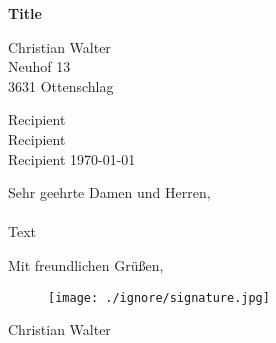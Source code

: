 \documentclass[11pt, a4paper]{article}
\begin{document}
\begin{center}
  \textbf{\Large{Title}}
\end{center}

\vspace{1cm}
Christian Walter\\
Neuhof 13\\
3631 Ottenschlag\\
\vspace{1cm}

Recipient\\
Recipient\\
Recipient
\hfill
\today\\
\vspace{1cm}

Sehr geehrte Damen und Herren,\\\\
Text

Mit freundlichen Grüßen,
\begin{figure}[!ht]
  \texttt{[image: ./ignore/signature.jpg]}
\end{figure}
\FloatBarrier
\vspace{-0.5cm}
Christian Walter
\end{document}
